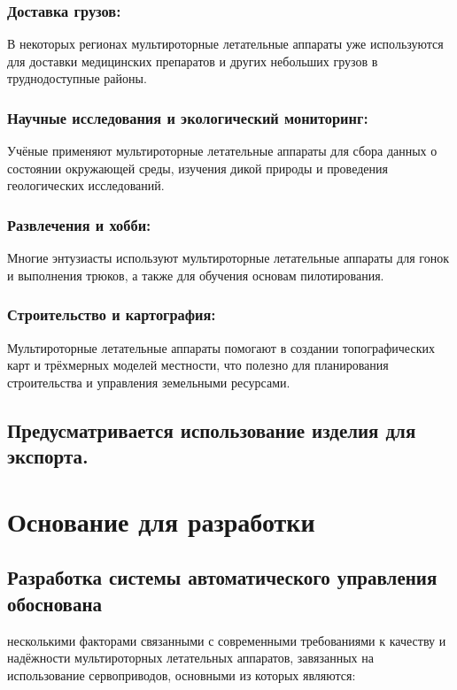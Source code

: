\documentclass[a4paper]{bsuir-tor}
\begin{document}
\subsubsection{Доставка грузов: }
В некоторых регионах мультироторные летательные аппараты уже
используются для доставки медицинских препаратов и других небольших
грузов в труднодоступные районы.

\subsubsection{Научные исследования и экологический мониторинг: }
Учёные применяют мультироторные летательные аппараты для сбора данных
о состоянии окружающей среды, изучения дикой природы и проведения
геологических исследований.

\subsubsection{Развлечения и хобби: }
Многие энтузиасты используют мультироторные летательные аппараты для
гонок и выполнения трюков, а также для обучения основам пилотирования.

\subsubsection{Строительство и картография: }
Мультироторные летательные аппараты помогают в создании
топографических карт и трёхмерных моделей местности, что полезно для
планирования строительства и управления земельными ресурсами.



\subsection{Предусматривается использование изделия для экспорта.}

\section{Основание для разработки}

\subsection{Разработка системы автоматического управления обоснована}
несколькими факторами связанными с современными требованиями к
качеству и надёжности мультироторных летательных аппаратов, завязанных
на использование сервоприводов, основными из которых являются:
\end{document}
